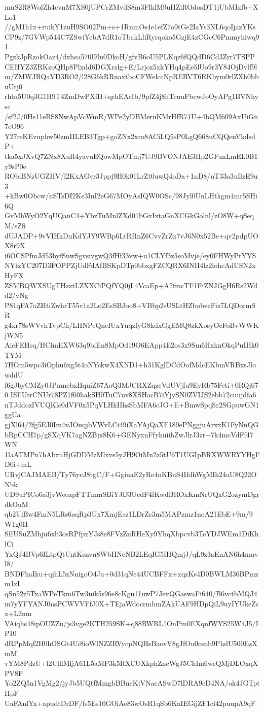 mnS2R8WolZh4cvnM7XS0jUPCrZMvdS8m3FlklM9uHZiROdosDT1jUbMIxfb+XLo1
//gM1h1x+ruikY1zuH9SO02Pm+s+1RnmOs4e1efZ7o9tGe2IaYs3NL6qoIjazYKs
CP9z/7GVWp544C7ZSwiYcbA7dR1oTbakLliRyrqoko5GzjE4zCGcC6Pmmyhiwq91
PgzkJpRzokOaz4/dxhea570l9Iu0DkoH/gfvB6oU5PLKqz6fQQdD6Cd3Zrr7TSPP
CEHYZ3ZRKzoQHp8Plxdd6DGXrzlg+E/Lrjoz5xkYHq4pEe5lUo9r3Y84OjDvlf9l
m/ZMWJRQaVD3RO2/l28G6kRRuaxtboCFWelccNpRERVT6RKbym0rlZXh0bbuUtj0
rhtn5U0q3G1H9T4ZmDwPXfH+qrhEAcIb/9pfZ4j8hTcuuFbcwJoOyAPg1BVNhysc
/sf2J/0Hs11eBS8NwApVcWmR/WPe2yDBMeruKMrHfR71U+4bQM609AxUiGn7cO96
Y27rsKEvuphw50zmIILEB3Tgp+goZNx2xro8ACiLQ5sP0LgQ668uCQQenVkdsdP+
tka5xJXvQ7ZNx8XuR4yavuEQowMpOTmj7UJ9BVONJAE3Hp2GFunLmEL0B1y9sP0e
RObiBNzUGZHV/l2KxAGvr3Jppj9H0k01LrZt0uwQ4oDa+1nD8/uT33a3uIlzE9u3
+kBw0Obcw/nSTsDI2Ke3InI2eG67MOyAsIQW0OSc/98Jyl0UnLHtkgm4mr5SHi6Q
GvMhWyO2YqUQanC4+YbzTuMnlZXd01bGxIxtaGnXCGkGolnl/zO8W+qSeqM/sZfi
dUJADP+9vVIHkDuKdYJY9WBp6LtRRnZ6CvvZrZx7vJ6N0x52Be+qv2pdpUOX8r9X
i6OCSPfmJd53byfSnwSgvsivgwQ3fHf33vw+u1CLYf3z5soMvje/ey0FHWyPtYYS
NYtzYC207D3FOPPZjUdFdAfBSKpDTp0bbxgFZCQRX6INH4lz2lohcAdUSN2xHyFX
ZSMBQWXSUgTHzztLZXXCiPQfYQ0jL4VcaEp+A2fmcTF1FiZNJGgH6Rs2Wdd2/vNg
P81qFA7aZHtiZwhrT55v1a2Lo2EsSBJoo8+VBbp2sUSLtHZbobveFiz7LQDormSR
g4xr78sWVvhTvpCh/LHNPeQncIUxYuqzfyG8kdxGgEMQ8zkXosyOcFoBvWWKjWN5
AieFEHsq/HClmEXW63q9biEn8MpOd19O6EApp4E2os3x9Sm6HxknOkqPuIHk0TYM
7HOm5wpc3iOphu6xg5t4oNYckwX4XND1+h31KglDCdOofMdcEKbmVRBxsJlowddU
f6gJbyCMZy0JPmncbxHquiZ67AoQ3MJCRXZqzcVdUVjfu9EyRb75Fcti+0RQj670
ISFUtrCNUr78PZ1f60hakSH0TuC7nv8XSHacB7iYjySN0ZVIJS2ebb72cuujdfa6
nTJddozIVUQKlc0dVF0x5PqVLHkIIhsSbMFA6cJG+E+BmwSpqSr2SGpuwGN1ggUa
gjXl64/2fg5EJ0Im4vJOuqjbVWvLCi49iXaYAjQaXF189ePNggjuArxxK1FyNnQG
bRpCCH7p/gSXqVK7agNZBjx8K6+GENyxnFfykuiihZwJlrJ3zr+7k4mcVdFf47WN
1laATMPn7hAbxuHjGDDMzMlxvs5yJH9OiMn2z5tU6T1UGIpBRXWWRYYHgFD0i+mL
URvjCAJMAEB/Ty76ycJ8tgC/F+GgiuaE2yRe4nKBuS4IfdhWgMIh24aU8Q22ONbk
UD9uPICo6a3jvWeozpFTTmmSBiYJD3UcdF4fKwdBROxKmNrUQxG2ozymDgrdkOuM
qb2UiBw4FmN5LRs6aqRp3Ux7XmjEsz1LDrZs3m5MAPzmz1noA21EbE+9m/9W1g0H
SEUSuZMhju6xb3osRPfpxYJs8e8FVzZuRHeXy9YhqXbpcvb3TeYDJWEm1DiKhlCi
YxQJ4BVp6ILtpQtUntKsnvn8WbHNeNB2LEqIG5IHQmjJ/qL9z3aEnAN6h4nmvl8/
BNDFhaIku+qjhL5zNnigoO4Ju+0d31qNe44UCBFFx+xqzKs4D0BWLM36BPmzm1zI
qSu52z5TxaWPeTkm6Tw3uik5s96e8cKgu11uwP7JexQGaswaFi640/B6vctbMQJ4
m7yYFYANJ0nsPCWVVFfJ0X+TEjaWdocrmhmZAkUAF9HDpQiL9uyIYUkeZcx+L2nm
VAiqhs48ipOUZZu/js3vge2KTH259SK+q88RWRL1OnPm0EXqnfWYS25W4J5/IP10
dRPpMqf2H0hOSGt4Ui8ioWlNZZRVycpNQHsBaovV8gJfOu0csnb9PhdU500EzXmM
vYM8PdzU+l2UlllMljA61L5aMP3k5RXCUXkphZncWgJ5CIdm6wrQMjDLOxqXPV8F
Yo2ZQ5n1VgMg2/jyJb5UQtfMmgbBBneKiVNaeASwD7lDRA9cD4NA/ok4JGTptHpF
UaFAnlYx+apudtDrDF/fs5Es10GOiAe83wOsR1qSb6KaIEGijZF1cl42puupA9qF
